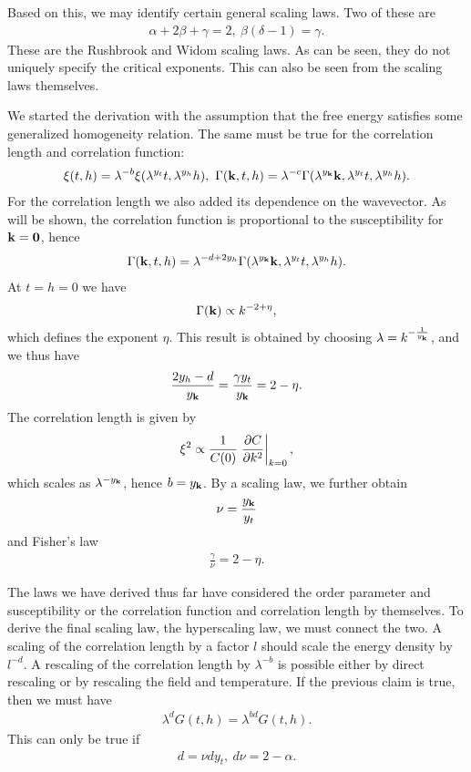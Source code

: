 Based on this, we may identify certain general scaling laws. Two of these are
\begin{align*}
	\alpha + 2\beta + \gamma = 2,\ \beta(\delta - 1) = \gamma.
\end{align*}
These are the Rushbrook and Widom scaling laws. As can be seen, they do not uniquely specify the critical exponents. This can also be seen from the scaling laws themselves.

We started the derivation with the assumption that the free energy satisfies some generalized homogeneity relation. The same must be true for the  correlation length and correlation function:
\begin{align*}
	\xi(t, h) = \lambda^{-b}\xi(\lambda^{y_{t}}t, \lambda^{y_{h}}h),\ \Gamma(\vb{k}, t, h) = \lambda^{-c}\Gamma(\lambda^{y_{\vb{k}}}\vb{k}, \lambda^{y_{t}}t, \lambda^{y_{h}}h).
\end{align*}
For the correlation length we also added its dependence on the wavevector. As will be shown, the correlation function is proportional to the susceptibility for $\vb{k} = \vb{0}$, hence
\begin{align*}
	\Gamma(\vb{k}, t, h) = \lambda^{-d + 2y_{h}}\Gamma(\lambda^{y_{\vb{k}}}\vb{k}, \lambda^{y_{t}}t, \lambda^{y_{h}}h).
\end{align*}
At $t = h = 0$ we have
\begin{align*}
	\Gamma(\vb{k}) \propto k^{-2 + \eta},
\end{align*}
which defines the exponent $\eta$. This result is obtained by choosing $\lambda = k^{-\frac{1}{y_{\vb{k}}}}$, and we thus have
\begin{align*}
	\frac{2y_{h} - d}{y_{\vb{k}}} = \frac{\gamma y_{t}}{y_{\vb{k}}} = 2 - \eta.
\end{align*}
The correlation length is given by
\begin{align*}
	\xi^{2} \propto \frac{1}{C(0)}\eval{\pdv{C}{k^{2}}}_{k = 0},
\end{align*}
which scales as $\lambda^{-y_{\vb{k}}}$, hence $b = y_{\vb{k}}$. By a scaling law, we further obtain
\begin{align*}
	\nu = \frac{y_{\vb{k}}}{y_{t}}
\end{align*}
and Fisher's law
\begin{align*}
	\frac{\gamma}{\nu} = 2 - \eta.
\end{align*}

The laws we have derived thus far have considered the order parameter and susceptibility or the correlation function and correlation length by themselves. To derive the final scaling law, the hyperscaling law, we must connect the two. A scaling of the correlation length by a factor $l$ should scale the energy density by $l^{-d}$. A rescaling of the correlation length by $\lambda^{-b}$ is possible either by direct rescaling or by rescaling the field and temperature. If the previous claim is true, then we must have
\begin{align*}
	\lambda^{d}G(t, h) = \lambda^{bd}G(t, h).
\end{align*}
This can only be true if
\begin{align*}
	d = \nu dy_{t},\ d\nu = 2 - \alpha.
\end{align*}

